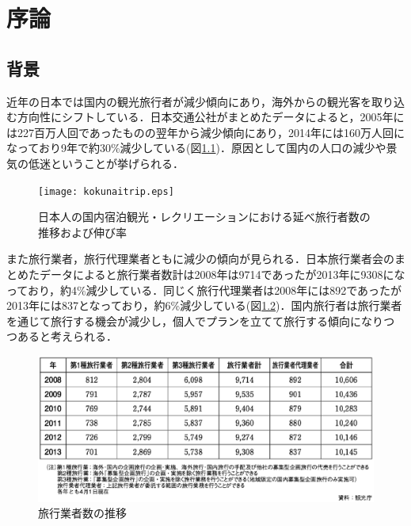 \documentclass{funthesis}
\begin{document}
\chapter{序論} %



\section{背景}
近年の日本では国内の観光旅行者が減少傾向にあり，海外からの観光客を取り込む方向性にシフトしている．日本交通公社がまとめたデータ\cite{kokunaitrip}によると，2005年には227百万人回であったものの翌年から減少傾向にあり，2014年には160万人回になっており9年で約30\%減少している(図\ref{kokunai})．原因として国内の人口の減少や景気の低迷ということが挙げられる．

\begin{figure}[htpb]
\begin{center}
\texttt{[image: kokunaitrip.eps]}
\end{center}
\caption{日本人の国内宿泊観光・レクリエーションにおける延べ旅行者数の推移および伸び率}
\label{kokunai}
\end{figure}

また旅行業者，旅行代理業者ともに減少の傾向が見られる．日本旅行業者会のまとめたデータ\cite{ryokougyokai}によると旅行業者数計は2008年は9714であったが2013年に9308になっており，約4\%減少している．同じく旅行代理業者は2008年には892であったが2013年には837となっており，約6\%減少している(図\ref{gyosya})．国内旅行者は旅行業者を通じて旅行する機会が減少し，個人でプランを立てて旅行する傾向になりつつあると考えられる．

\begin{figure}[htpb]
\begin{center}
\includegraphics[scale=0.68]{tripgyosya.eps}
\end{center}
\caption{旅行業者数の推移}
\label{gyosya}
\end{figure}
\end{document}
